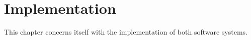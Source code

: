 \chapter{Implementation}\label{ch:implementation}

This chapter concerns itself with the implementation of both software systems.





